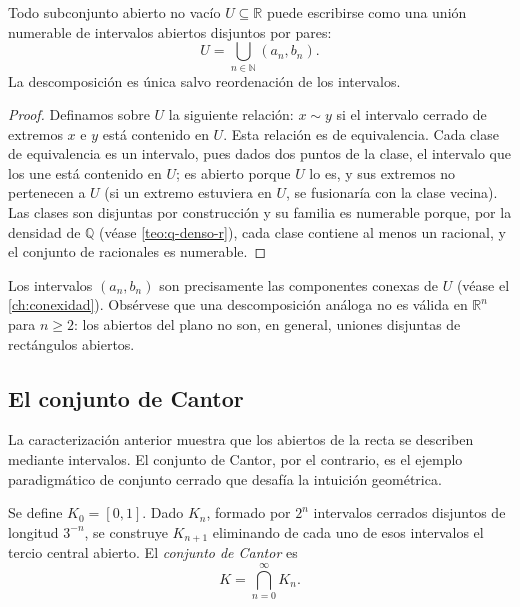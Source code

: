 \begin{theorem}
\label{teo:abiertos-r}
Todo subconjunto abierto no vacío $U\subseteq\mathbb{R}$ puede escribirse como una unión numerable de intervalos abiertos disjuntos por pares:
\[
  U=\bigcup_{n\in\mathbb{N}}(a_n,b_n).
\]
La descomposición es única salvo reordenación de los intervalos.
\end{theorem}
\begin{proof}
Definamos sobre $U$ la siguiente relación: $x\sim y$ si el intervalo cerrado de extremos $x$ e $y$ está contenido en $U$. Esta relación es de equivalencia. Cada clase de equivalencia es un intervalo, pues dados dos puntos de la clase, el intervalo que los une está contenido en $U$; es abierto porque $U$ lo es, y sus extremos no pertenecen a $U$ (si un extremo estuviera en $U$, se fusionaría con la clase vecina). Las clases son disjuntas por construcción y su familia es numerable porque, por la densidad de $\mathbb{Q}$ (véase \cref{teo:q-denso-r}), cada clase contiene al menos un racional, y el conjunto de racionales es numerable.
\end{proof}

\begin{remark}
Los intervalos $(a_n,b_n)$ son precisamente las componentes conexas de $U$ (véase el \cref{ch:conexidad}). Obsérvese que una descomposición análoga no es válida en $\mathbb{R}^n$ para $n\geq 2$: los abiertos del plano no son, en general, uniones disjuntas de rectángulos abiertos.
\end{remark}

\subsection{El conjunto de Cantor}

La caracterización anterior muestra que los abiertos de la recta se describen mediante intervalos. El conjunto de Cantor, por el contrario, es el ejemplo paradigmático de conjunto cerrado que desafía la intuición geométrica.

\begin{definition}
\label{def:conjunto-cantor}
Se define $K_0=[0,1]$. Dado $K_n$, formado por $2^n$ intervalos cerrados disjuntos de longitud $3^{-n}$, se construye $K_{n+1}$ eliminando de cada uno de esos intervalos el tercio central abierto. El \emph{conjunto de Cantor} es
\[
  K=\bigcap_{n=0}^{\infty}K_n.
\]
\end{definition}

